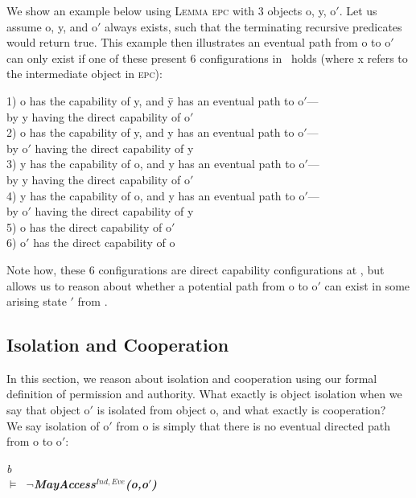 \documentclass[a4paper,11pt,twoside]{article}
\makeatletter
\newenvironment{logic}
{\begin{minipage}[c]{\linewidth}  \sffamily \mdseries \begin{tabbing}}
{\end{tabbing}\end{minipage}\vspace{0.3em}}
\newcommand{\losigma}{\text{$\upsigma$}}
\newcommand{\loturns} {$\vDash$}
\newcommand{\loneg}{$\boldsymbol \neg$}
\DeclareRobustCommand{\emp}{%
  \@nomath\em \if b\expandafter\@car\f@series\@nil
  \normalfont \else \sffamily \bfseries \fi}
\makeatother
\begin{document}
We show an example below using \textsc{Lemma epc} with 3 objects o, y, o$'$. Let us assume o, y, and o$'$ always exists, such that the terminating recursive predicates would return true. This example then illustrates an eventual path from o to o$'$ can only exist if one of these present 6 configurations in \losigma\ holds (where x refers to the intermediate object in \textsc{epc}):
\begin{tabbing}
1) o has the capability of y, and \=y has an eventual path to o$'$---\\
\>by y having the direct capability of o$'$\\
2) o has the capability of y, and y has an eventual path to o$'$---\\
\>by o$'$ having the direct capability of y\\
3) y has the capability of o, and y has an eventual path to o$'$---\\
\>by y having the direct capability of o$'$\\
4) y has the capability of o, and y has an eventual path to o$'$---\\
\>by o$'$ having the direct capability of y\\
5) o has the direct capability of o$'$\\
6) o$'$ has the direct capability of o\\
\end{tabbing}
Note how, these 6 configurations are direct capability configurations at \losigma, but allows us to reason about whether a potential path from o to o$'$ can exist in some arising state \losigma$'$ from \losigma.\\

\subsection{Isolation and Cooperation}\label{sec:isolation and cooperation}
In this section, we reason about isolation and cooperation using our formal definition of permission and authority. What exactly is object isolation when we say that object o$'$ is isolated from object o, and what exactly is cooperation?\\

We say isolation of o$'$ from o is simply that there is no eventual directed path from o to o$'$:\\

\begin{logic}
\emp{Isolation of o$'$ from o:}\\
\loturns\ \loneg MayAccess$^{Ind,Eve}$(o,o$'$)\\
\end{logic}
\end{document}
